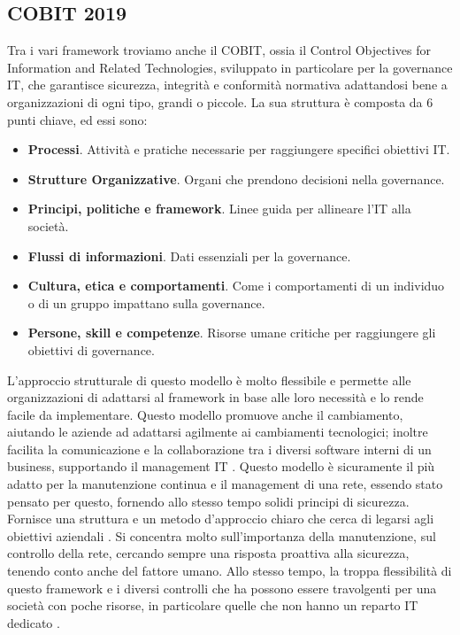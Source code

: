         \subsection{COBIT 2019}
            Tra i vari framework troviamo anche il COBIT, ossia il Control Objectives for Information and Related Technologies, sviluppato in particolare per la governance IT, che garantisce sicurezza, integrità e conformità normativa adattandosi bene a organizzazioni di ogni tipo, grandi o piccole.
            La sua struttura è composta da 6 punti chiave, ed essi sono:
            \begin{itemize}
                \item \textbf{Processi}. Attività e pratiche necessarie per raggiungere specifici obiettivi IT.
                \item \textbf{Strutture Organizzative}. Organi che prendono decisioni nella governance.
                \item \textbf{Principi, politiche e framework}. Linee guida per allineare l'IT alla società.
                \item \textbf{Flussi di informazioni}. Dati essenziali per la governance.
                \item \textbf{Cultura, etica e comportamenti}. Come i comportamenti di un individuo o di un gruppo impattano sulla governance.
                \item \textbf{Persone, skill e competenze}. Risorse umane critiche per raggiungere gli obiettivi di governance.
            \end{itemize}
            L'approccio strutturale di questo modello è molto flessibile e permette alle organizzazioni di adattarsi al framework in base alle loro necessità e lo rende facile da implementare. Questo modello promuove anche il cambiamento, aiutando le aziende ad adattarsi agilmente ai cambiamenti tecnologici; inoltre facilita la comunicazione e la collaborazione tra i diversi software interni di un business, supportando il management IT \cite{cobit_overview}.
            Questo modello è sicuramente il più adatto per la manutenzione continua e il management di una rete, essendo stato pensato per questo, fornendo allo stesso tempo solidi principi di sicurezza. Fornisce una struttura e un metodo d'approccio chiaro che cerca di legarsi agli obiettivi aziendali \cite{analysis_cobit_csf_iso27001}. Si concentra molto sull'importanza della manutenzione, sul controllo della rete, cercando sempre una risposta proattiva alla sicurezza, tenendo conto anche del fattore umano. Allo stesso tempo, la troppa flessibilità di questo framework e i diversi controlli che ha possono essere travolgenti per una società con poche risorse, in particolare quelle che non hanno un reparto IT dedicato \cite{cobit_fortinet_strengths_weaknesses}.


